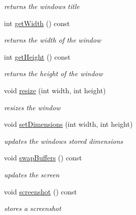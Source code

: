 \begin{DoxyCompactItemize}
\begin{DoxyCompactList}\small\item\em returns the window\textquotesingle{}s title \end{DoxyCompactList}\item 
\mbox{\label{classnta_1_1Window_ac6cb1a31bb8c219e189ca5f88e25dd45}} 
int \hyperlink{classnta_1_1Window_ac6cb1a31bb8c219e189ca5f88e25dd45}{get\+Width} () const
\begin{DoxyCompactList}\small\item\em returns the width of the window \end{DoxyCompactList}\item 
\mbox{\label{classnta_1_1Window_a0daae9b6ad0a0ea834f90e86a9416f88}} 
int \hyperlink{classnta_1_1Window_a0daae9b6ad0a0ea834f90e86a9416f88}{get\+Height} () const
\begin{DoxyCompactList}\small\item\em returns the height of the window \end{DoxyCompactList}\item 
\mbox{\label{classnta_1_1Window_a23b55b95d017fe35655ed1287869bdf1}} 
void \hyperlink{classnta_1_1Window_a23b55b95d017fe35655ed1287869bdf1}{resize} (int width, int height)
\begin{DoxyCompactList}\small\item\em resizes the window \end{DoxyCompactList}\item 
\mbox{\label{classnta_1_1Window_a3dd8aab88817189b409643d75e476597}} 
void \hyperlink{classnta_1_1Window_a3dd8aab88817189b409643d75e476597}{set\+Dimensions} (int width, int height)
\begin{DoxyCompactList}\small\item\em updates the window\textquotesingle{}s stored dimensions \end{DoxyCompactList}\item 
\mbox{\label{classnta_1_1Window_a5fdc643079410c14855a260ace84478e}} 
void \hyperlink{classnta_1_1Window_a5fdc643079410c14855a260ace84478e}{swap\+Buffers} () const
\begin{DoxyCompactList}\small\item\em updates the screen \end{DoxyCompactList}\item 
void \hyperlink{classnta_1_1Window_aa144f6bb014aaad3c91c3f3e6ad56f9c}{screenshot} () const
\begin{DoxyCompactList}\small\item\em stores a screenshot \end{DoxyCompactList}\end{DoxyCompactItemize}
